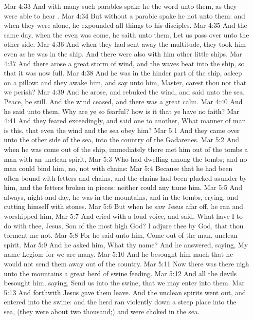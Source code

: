 \vs Mar 4:33 And with many such parables spake he the word unto them, as they were able to hear .
\vs Mar 4:34 But without a parable spake he not unto them: and when they were alone, he expounded all things to his disciples.
\vs Mar 4:35 And the same day, when the even was come, he saith unto them, Let us pass over unto the other side.
\vs Mar 4:36 And when they had sent away the multitude, they took him even as he was in the ship. And there were also with him other little ships.
\vs Mar 4:37 And there arose a great storm of wind, and the waves beat into the ship, so that it was now full.
\vs Mar 4:38 And he was in the hinder part of the ship, asleep on a pillow: and they awake him, and say unto him, Master, carest thou not that we perish?
\vs Mar 4:39 And he arose, and rebuked the wind, and said unto the sea, Peace, be still. And the wind ceased, and there was a great calm.
\vs Mar 4:40 And he said unto them, Why are ye so fearful? how is it that ye have no faith?
\vs Mar 4:41 And they feared exceedingly, and said one to another, What manner of man is this, that even the wind and the sea obey him?
\vs Mar 5:1 And they came over unto the other side of the sea, into the country of the Gadarenes.
\vs Mar 5:2 And when he was come out of the ship, immediately there met him out of the tombs a man with an unclean spirit,
\vs Mar 5:3 Who had  dwelling among the tombs; and no man could bind him, no, not with chains:
\vs Mar 5:4 Because that he had been often bound with fetters and chains, and the chains had been plucked asunder by him, and the fetters broken in pieces: neither could any  tame him.
\vs Mar 5:5 And always, night and day, he was in the mountains, and in the tombs, crying, and cutting himself with stones.
\vs Mar 5:6 But when he saw Jesus afar off, he ran and worshipped him,
\vs Mar 5:7 And cried with a loud voice, and said, What have I to do with thee, Jesus,  Son of the most high God? I adjure thee by God, that thou torment me not.
\vs Mar 5:8 For he said unto him, Come out of the man,  unclean spirit.
\vs Mar 5:9 And he asked him, What  thy name? And he answered, saying, My name  Legion: for we are many.
\vs Mar 5:10 And he besought him much that he would not send them away out of the country.
\vs Mar 5:11 Now there was there nigh unto the mountains a great herd of swine feeding.
\vs Mar 5:12 And all the devils besought him, saying, Send us into the swine, that we may enter into them.
\vs Mar 5:13 And forthwith Jesus gave them leave. And the unclean spirits went out, and entered into the swine: and the herd ran violently down a steep place into the sea, (they were about two thousand;) and were choked in the sea.
